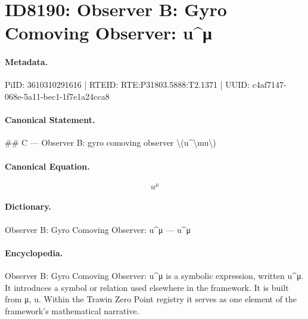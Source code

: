 \section*{ID8190: Observer B: Gyro Comoving Observer: u\textasciicircum{}μ}
\paragraph{Metadata.}
PiID: 3610310291616 | RTEID: RTE:P31803.5888:T2.1371 | UUID: c4af7147-068e-5a11-bec1-1f7e1a24cca8

\paragraph{Canonical Statement.}
\#\# C — Observer B: gyro comoving observer \textbackslash{}(u\textasciicircum{}\textbackslash{}mu\textbackslash{})

\paragraph{Canonical Equation.}
\[
u^\mu
\]

\paragraph{Dictionary.}
Observer B: Gyro Comoving Observer: u\textasciicircum{}μ — u\textasciicircum{}μ

\paragraph{Encyclopedia.}
Observer B: Gyro Comoving Observer: u\textasciicircum{}μ is a symbolic expression, written u\textasciicircum{}μ. It introduces a symbol or relation used elsewhere in the framework. It is built from μ, u. Within the Trawin Zero Point registry it serves as one element of the framework's mathematical narrative.
